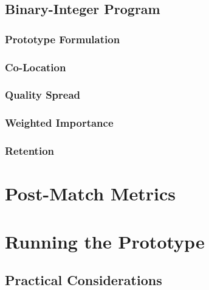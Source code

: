 \documentclass[mnsc,nonblindrev]{informs3} %
\begin{document}


\subsection{Binary-Integer Program}



\subsubsection{Prototype Formulation}
\label{Matching}



\subsubsection{Co-Location}
\label{CoLocation}



\subsubsection{Quality Spread}
\label{QualitySpread}



\subsubsection{Weighted Importance}
\label{Importance}



\subsubsection{Retention}
\label{Retention}



\section{Post-Match Metrics}\label{post-match}



\section{Running the Prototype}

\subsection{Practical Considerations}
\end{document}
